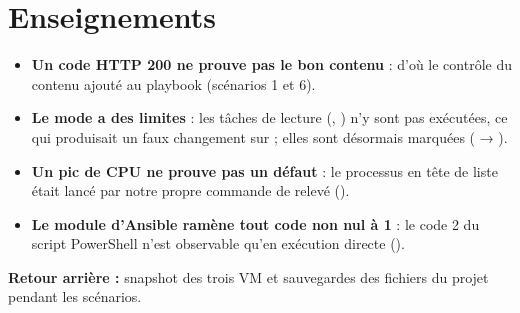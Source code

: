 \section{Enseignements}

\begin{itemize}
  \item \textbf{Un code HTTP 200 ne prouve pas le bon contenu} : d'où le contrôle du contenu ajouté au
        playbook (scénarios 1 et 6).
  \item \textbf{Le mode  a des limites} : les tâches de lecture (, )
        n'y sont pas exécutées, ce qui produisait un faux changement sur  ; elles sont
        désormais marquées  ( → ).
  \item \textbf{Un pic de CPU ne prouve pas un défaut} : le processus en tête de liste était lancé par
        notre propre commande de relevé ().
  \item \textbf{Le module  d'Ansible ramène tout code non nul à 1} : le code 2 du script
        PowerShell n'est observable qu'en exécution directe ().
\end{itemize}

\textbf{Retour arrière :} snapshot  des trois VM et sauvegardes
 des fichiers du projet pendant les scénarios.
